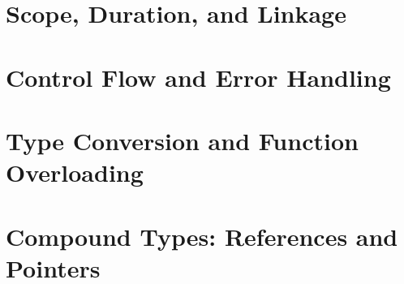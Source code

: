 \documentclass[UTF8]{ctexart}
\begin{document}
\newpage

\section{Scope, Duration, and Linkage}









\newpage

\section{Control Flow and Error Handling}



\newpage

\section{Type Conversion and Function Overloading}










\newpage

\section{Compound Types: References and Pointers}












\end{document}
